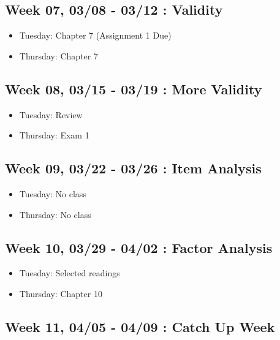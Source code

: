\documentclass[11pt,]{article}
\providecommand{\tightlist}{%
  \setlength{\itemsep}{0pt}\setlength{\parskip}{0pt}}
\begin{document}
\hypertarget{week-07-0308---0312-validity}{%
\subsection{Week 07, 03/08 - 03/12 :
Validity}\label{week-07-0308---0312-validity}}

\begin{itemize}
\tightlist
\item
  Tuesday: Chapter 7 (Assignment 1 Due)
\item
  Thursday: Chapter 7
\end{itemize}

\hypertarget{week-08-0315---0319-more-validity}{%
\subsection{Week 08, 03/15 - 03/19 : More
Validity}\label{week-08-0315---0319-more-validity}}

\begin{itemize}
\tightlist
\item
  Tuesday: Review
\item
  Thursday: Exam 1
\end{itemize}

\hypertarget{week-09-0322---0326-item-analysis}{%
\subsection{Week 09, 03/22 - 03/26 : Item
Analysis}\label{week-09-0322---0326-item-analysis}}

\begin{itemize}
\tightlist
\item
  Tuesday: No class
\item
  Thursday: No class
\end{itemize}

\hypertarget{week-10-0329---0402-factor-analysis}{%
\subsection{Week 10, 03/29 - 04/02 : Factor
Analysis}\label{week-10-0329---0402-factor-analysis}}

\begin{itemize}
\tightlist
\item
  Tuesday: Selected readings
\item
  Thursday: Chapter 10
\end{itemize}

\hypertarget{week-11-0405---0409-catch-up-week}{%
\subsection{Week 11, 04/05 - 04/09 : Catch Up
Week}\label{week-11-0405---0409-catch-up-week}}
\end{document}
